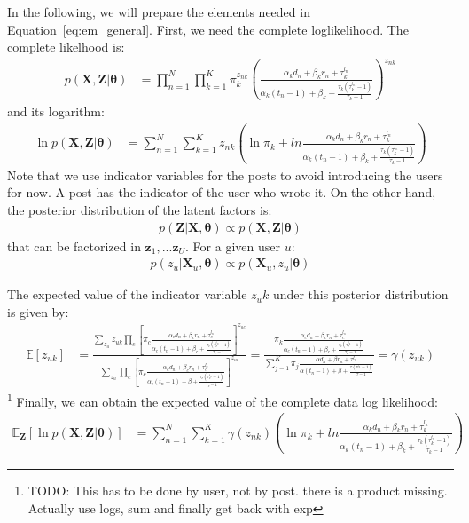 \documentclass[smallextended]{svjour3}          %
\begin{document}
In the following, we will prepare the elements needed in Equation~\ref{eq:em_general}. First, we need the complete loglikelihood. The complete likelhood is:
\begin{align}
p(\mathbf{X, Z} | \boldsymbol{\theta}) &= 
\prod_{n=1}^N \prod_{k=1}^K \pi_k^{z_{nk}}
\left(
\frac{\alpha_k d_n + \beta_k r_n + \tau_k^{l_n}}{\alpha_k(t_n-1)+\beta_k + \frac{\tau_k(\tau_k^{t_n}-1)}{\tau_k-1}}
\right)^{z_{nk}}
\end{align}
and its logarithm:
\begin{align}
\ln p(\mathbf{X, Z} | \boldsymbol{\theta}) &= 
\sum_{n=1}^N \sum_{k=1}^K z_{nk}
\left(\ln \pi_k + 
ln \frac{\alpha_k d_n + \beta_k r_n + \tau_k^{l_n}}{\alpha_k(t_n-1)+\beta_k + \frac{\tau_k(\tau_k^{t_n}-1)}{\tau_k-1}}\right)
\end{align}
Note that we use indicator variables for the posts to avoid introducing the users for now. A post has the indicator of the user who wrote it. On the other hand, the posterior distribution of the latent factors is:
\begin{align*}
p(\mathbf{Z} | \mathbf{X}, \boldsymbol{\theta}) 
\propto 
p(\mathbf{X,Z} | \boldsymbol{\theta})
\end{align*}
that can be factorized in $\mathbf{z}_1,...\mathbf{z}_U$. For a given user $u$:
\begin{align*}
p(z_u | \mathbf{X}_u, \boldsymbol{\theta}) 
\propto 
p(\mathbf{X}_u, z_u | \boldsymbol{\theta})
\end{align*}

The expected value of the indicator variable $z_uk$ under this posterior distribution is given by:
\begin{align}
\mathbb{E}[z_{uk}] 
&= 
\frac{\sum_{z_u} z_{uk} \prod_c\left[\pi_c \frac{\alpha_c d_n + \beta_c r_n + \tau_c^{l_n}}{\alpha_c(t_n-1)+\beta_c + \frac{\tau_c(\tau_c^{t_n}-1)}{\tau_c-1}} \right]^{z_{uc}}}
{\sum_{z_u} \prod_c\left[\pi_c \frac{\alpha_c d_n + \beta_c r_n + \tau_c^{l_n}}{\alpha_c(t_n-1)+\beta + \frac{\tau_c(\tau_c^{t_n}-1)}{\tau_c-1}} \right]^{z_{uc}}}
=
\frac{\pi_{k} \frac{\alpha_c d_n + \beta_c r_n + \tau_c^{l_n}}{\alpha_c(t_n-1)+\beta_c + \frac{\tau_c(\tau_c^{t_n}-1)}{\tau_c-1}}}
{
\sum_{j=1}^{K}\pi_{j} \frac{\alpha d_n + \beta r_n + \tau^{l_n}}{\alpha(t_n-1)+\beta + \frac{\tau(\tau^{t_n}-1)}{\tau-1}} 
}
= \gamma(z_{uk})
\end{align}
\footnote{TODO: This has to be done by user, not by post. there is a product missing. Actually use logs, sum and finally get back with exp}
Finally, we can obtain the expected value of the complete data log likelihood:
\begin{align}
\mathbb{E}_{\mathbf{Z}}[\ln p(\mathbf{X,Z} | \boldsymbol{\theta})] &=
\sum_{n=1}^N \sum_{k=1}^K \gamma(z_{nk})
\left(
\ln \pi_k + 
ln \frac{\alpha_k d_n + \beta_k r_n + \tau_k^{l_n}}{\alpha_k(t_n-1)+\beta_k + \frac{\tau_k(\tau_k^{t_n}-1)}{\tau_k-1}}
\right)
\end{align}
\end{document}
